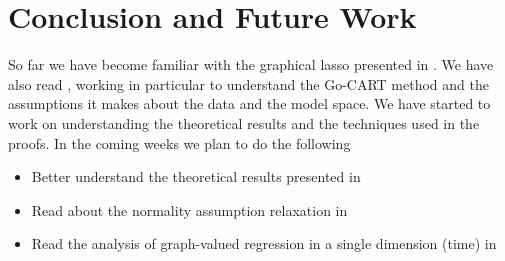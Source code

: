 \documentclass[12pt]{article}
\begin{document}
\section{Conclusion and Future Work}

So far we have become familiar with the graphical lasso presented in
\cite{friedman2008}. We have also read \cite{liu2009}, working in
particular to understand the Go-CART method and the assumptions it
makes about the data and the model space. We have started to work on
understanding the theoretical results and the techniques used in the
proofs. In the coming weeks we plan to do the following

\begin{itemize}
\item Better understand the theoretical results presented in \cite{liu2010}
\item Read about the normality assumption relaxation in \cite{liu2009}
\item Read the analysis of graph-valued regression in a single dimension (time) in \cite{zhou2010}
\end{itemize}
\end{document}
